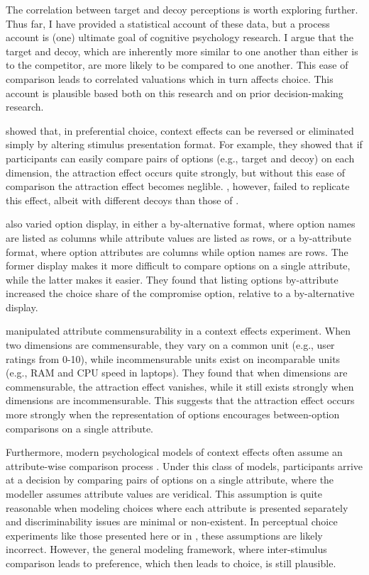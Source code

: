 The correlation between target and decoy perceptions is worth exploring further. Thus far, I have provided a statistical account of these data, but a process account is (one) ultimate goal of cognitive psychology research. I argue that the target and decoy, which are inherently more similar to one another than either is to the competitor, are more likely to be compared to one another. This ease of comparison leads to correlated valuations which in turn affects choice. This account is plausible based both on this research and on prior decision-making research.

\textcite{cataldoComparisonProcessAccount2019b} showed that, in preferential choice, context effects can be reversed or eliminated simply by altering stimulus presentation format. For example, they showed that if participants can easily compare pairs of options (e.g., target and decoy) on each dimension, the attraction effect occurs quite strongly, but without this ease of comparison the attraction effect becomes neglible. \textcite{hasan2025registered}, however, failed to replicate this effect, albeit with different decoys than those of \textcite{cataldoComparisonProcessAccount2019b}. 

\textcite{changWhichCompromiseOption2008} also varied option display, in either a by-alternative format, where option names are listed as columns while attribute values are listed as rows, or a by-attribute format, where option attributes are columns while option names are rows. The former display makes it more difficult to compare options on a single attribute, while the latter makes it easier. They found that listing options by-attribute increased the choice share of the compromise option, relative to a by-alternative display. 

\textcite{hayes2024attribute} manipulated attribute commensurability in a context effects experiment. When two dimensions are commensurable, they vary on a common unit (e.g., user ratings from 0-10), while incommensurable units exist on incomparable units (e.g., RAM and CPU speed in laptops). They found that when dimensions are commensurable, the attraction effect vanishes, while it still exists strongly when dimensions are incommensurable. This suggests that the attraction effect occurs more strongly when the representation of options encourages between-option comparisons on a single attribute.

Furthermore, modern psychological models of context effects often assume an attribute-wise comparison process \parencite{roeMultialternativeDecisionField2001a,trueblood2013not,usherLossAversionInhibition2004a,bhatiaAssociationsAccumulationPreference2013b}. Under this class of models, participants arrive at a decision by comparing pairs of options on a single attribute, where the modeller assumes attribute values are veridical. This assumption is quite reasonable when modeling choices where each attribute is presented separately and discriminability issues are minimal or non-existent. In perceptual choice experiments like those presented here or in \textcite{spektorWhenGoodLooks2018b,trueblood2013not}, these assumptions are likely incorrect. However, the general modeling framework, where inter-stimulus comparison leads to preference, which then leads to choice, is still plausible.

